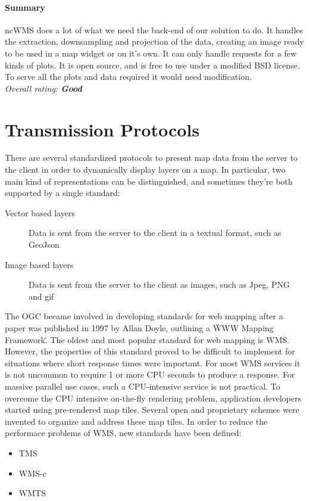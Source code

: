 \documentclass[11pt,a4paper,titlepage,oneside]{report}
\begin{document}
    \paragraph{Summary}
    ncWMS does a lot of what we need the back-end of our solution to do. It handles the extraction, downsampling and projection of the data, creating an image ready to be used in a map widget or on it's own. It can only handle requests for a few kinds of plots. It is open source, and is free to use under a modified BSD license. To serve all the plots and data required it would need modification.
  \\ \emph{Overall rating: \textbf{Good}}

\section{Transmission Protocols}
  There are several standardized protocols to present map data from the server to the client in order to dynamically display layers on a map.
  In particular, two main kind of representations can be distinguished, and sometimes they're both supported by a single standard:
  \begin{description}
    \item[Vector based layers] Data is sent from the server to the client in a textual format, such as GeoJson
    \item[Image based layers] Data is sent from the server to the client as images, such as Jpeg, \gls{PNG} and gif
  \end{description}

  The \acrfull{OGC} became involved in developing standards for web mapping after a paper was published in 1997 by Allan Doyle, outlining a \"WWW Mapping Framework\". The oldest and most popular standard for web mapping is \gls{WMS}. However, the properties of this standard proved to be difficult to implement for situations where short response times were important. For most \gls{WMS} services it is not uncommon to require 1 or more CPU seconds to produce a response. For massive parallel use cases, such a CPU-intensive service is not practical. To overcome the CPU intensive on-the-fly rendering problem, application developers started using pre-rendered map tiles. Several open and proprietary schemes were invented to organize and address these map tiles. 
  In order to reduce the performace problems of \gls{WMS}, new standards have been defined:
  \begin{itemize}
    \item TMS
    \item WMS-c
    \item WMTS
  \end{itemize}
  
\end{document}
